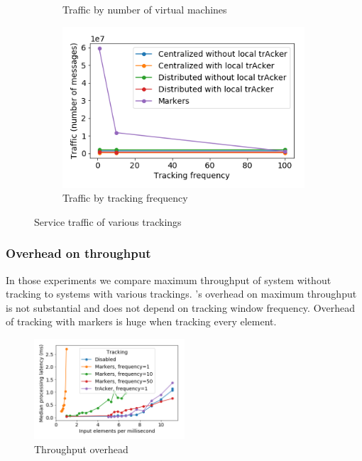 \begin{figure}[t!]
\begin{subfigure}[b]{0.32\textwidth}
            \caption{Traffic by number of virtual machines}
    \end{subfigure}
    \hspace{5mm}
    \begin{subfigure}[b]{0.32\textwidth}
            \includegraphics[width=0.99\textwidth]{pics/traffic_by_tracking_frequency.png}
            \caption{Traffic by tracking frequency}
	\end{subfigure}
    \caption{Service traffic of various trackings}
\end{figure}

\subsubsection{Overhead on throughput} \label{overhead}

In those experiments we compare maximum throughput of system without tracking to systems with various trackings. \tracker's overhead on maximum throughput is not substantial and does not depend on tracking window frequency. Overhead of tracking with markers is huge when tracking every element.

\begin{figure}[htbp]
  \centering
  \includegraphics[width=0.50\textwidth]{pics/throughput_overhead.png}
  \caption{Throughput overhead}
\end{figure}

